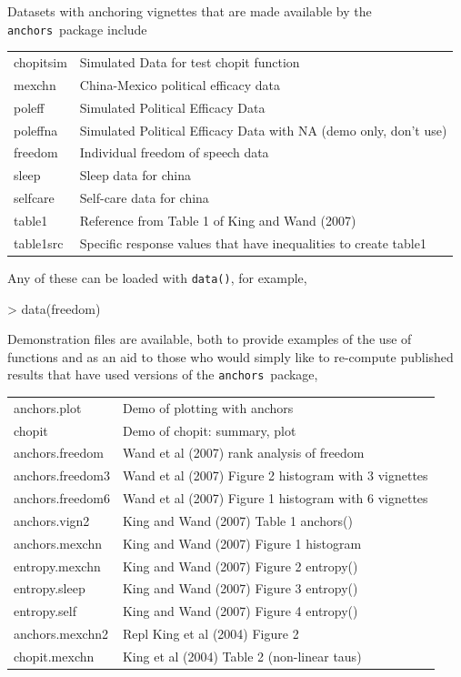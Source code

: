 \documentclass{amsart}
\newcommand{\code}[1]{{\texttt{#1}}}
\newcommand{\Ranchors}{{\texttt{anchors}}}
\begin{document}
\noindent
Datasets with anchoring vignettes that are made available by the
\Ranchors\ package include

\begin{tabular}{ll}
chopitsim  & Simulated Data for test chopit function\\
mexchn     & China-Mexico political efficacy data \\
poleff     & Simulated Political Efficacy Data \\
poleffna   & Simulated Political Efficacy Data with NA (demo only, don't use)\\
freedom    & Individual freedom of speech data\\
sleep      & Sleep data for china\\
selfcare   & Self-care data for china\\
table1     & Reference from Table 1 of King and Wand (2007)\\
table1src  & Specific response values that have inequalities to create table1\\
\end{tabular}

\noindent
Any of these can be loaded with \code{data()}, for example,
\begin{Schunk}
\begin{Sinput}
> data(freedom)
\end{Sinput}
\end{Schunk}

Demonstration files are available, both to provide examples of the use
of functions and as an aid to those who would simply like to
re-compute published results that have used versions of the \Ranchors\
package,

\begin{tabular}{ll}
anchors.plot    &   Demo of plotting with anchors\\
chopit 		&   Demo of chopit: summary, plot      \\
anchors.freedom &   Wand et al (2007) rank analysis of freedom\\
anchors.freedom3&   Wand et al (2007) Figure 2 histogram with 3 vignettes  \\
anchors.freedom6&   Wand et al (2007) Figure 1 histogram with 6 vignettes  \\
anchors.vign2   &   King and Wand (2007) Table 1 anchors()   \\
anchors.mexchn  &   King and Wand (2007) Figure 1 histogram   \\
entropy.mexchn  &   King and Wand (2007) Figure 2 entropy()   \\
entropy.sleep   &   King and Wand (2007) Figure 3 entropy()   \\ 
entropy.self    &   King and Wand (2007) Figure 4 entropy()   \\ 
anchors.mexchn2 &  Repl King et al (2004) Figure 2  \\
chopit.mexchn   &   King et al (2004) Table 2 (non-linear taus)\\
\end{tabular}
\end{document}
